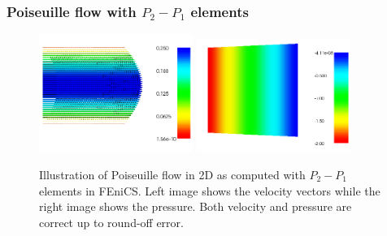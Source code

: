 \begin{frame}
 \frametitle{Poiseuille flow with $P_2-P_1$ elements}
 \begin{center}
 \begin{figure}
 \includegraphics[width=5cm]{png/poiseuille_velocity.png}
 \includegraphics[width=5cm]{png/poiseuille_pressure_p2p1.png}
 \caption{Illustration of Poiseuille flow in 2D as computed with $P_2-P_1$ elements in FEniCS.
 Left image shows the velocity vectors while the right image shows the pressure.
 Both velocity and pressure are correct up to round-off error.}
 \end{figure}
 \end{center}
\end{frame}

